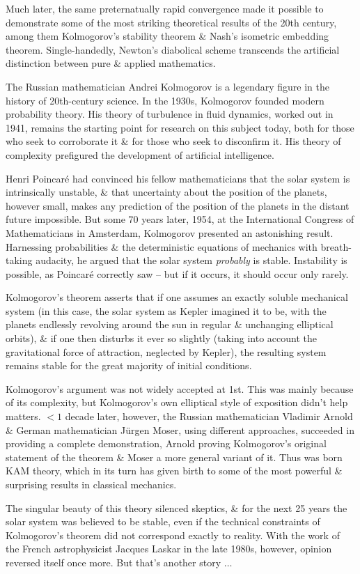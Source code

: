 \documentclass{article}
\begin{document}
\begin{enumerate}
	Much later, the same preternatually rapid convergence made it possible to demonstrate some of the most striking theoretical results of the 20th century, among them {\sc Kolmogorov}'s stability theorem \& {\sc Nash}'s isometric embedding theorem. Single-handedly, {\sc Newton}'s diabolical scheme transcends the artificial distinction between pure \& applied mathematics.
	
	The Russian mathematician {\sc Andrei Kolmogorov} is a legendary figure in the history of 20th-century science. In the 1930s, {\sc Kolmogorov} founded modern probability theory. His theory of turbulence in fluid dynamics, worked out in 1941, remains the starting point for research on this subject today, both for those who seek to corroborate it \& for those who seek to disconfirm it. His theory of complexity prefigured the development of artificial intelligence.
	
	{\sc Henri Poincar\'e} had convinced his fellow mathematicians that the solar system is intrinsically unstable, \& that uncertainty about the position of the planets, however small, makes any prediction of the position of the planets in the distant future impossible. But some 70 years later, 1954, at the International Congress of Mathematicians in Amsterdam, {\sc Kolmogorov} presented an astonishing result. Harnessing probabilities \& the deterministic equations of mechanics with breath-taking audacity, he argued that the solar system {\it probably} is stable. Instability is possible, as {\sc Poincar\'e} correctly saw -- but if it occurs, it should occur only rarely.
	
	{\sc Kolmogorov}'s theorem asserts that if one assumes an exactly soluble mechanical system (in this case, the solar system as {\sc Kepler} imagined it to be, with the planets endlessly revolving around the sun in regular \& unchanging elliptical orbits), \& if one then disturbs it ever so slightly (taking into account the gravitational force of attraction, neglected by {\sc Kepler}), the resulting system remains stable for the great majority of initial conditions.
	
	{\sc Kolmogorov}'s argument was not widely accepted at 1st. This was mainly because of its complexity, but {\sc Kolmogorov}'s own elliptical style of exposition didn't help matters. $< 1$ decade later, however, the Russian mathematician {\sc Vladimir Arnold} \& German mathematician {\sc J\"urgen Moser}, using different approaches, succeeded in providing a complete demonstration, {\sc Arnold} proving {\sc Kolmogorov}'s original statement of the theorem \& {\sc Moser} a more general variant of it. Thus was born KAM theory, which in its turn has given birth to some of the most powerful \& surprising results in classical mechanics.
	
	The singular beauty of this theory silenced skeptics, \& for the next 25 years the solar system was believed to be stable, even if the technical constraints of {\sc Kolmogorov}'s theorem did not correspond exactly to reality. With the work of the French astrophysicist {\sc Jacques Laskar} in the late 1980s, however, opinion reversed itself once more. But that's another story $\ldots$
	
\end{enumerate}
\end{document}

